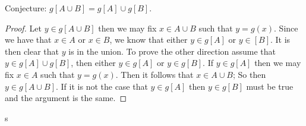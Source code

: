\documentclass[11pt,largemargins]{homework}
\begin{document}
\begin{alphaparts}
    Conjecture: $g[A \cup B] = g[A] \cup g[B]$. 

    \begin{proof}
        Let $y \in g[A \cup B]$ then we may fix $x \in A \cup B$ such that $y = g(x)$. Since we have that $x \in A$ or $x \in B$, we know that either $y \in g[A] $ or $y \in [B]$. It is then clear that $y$ is in the union. 
        To prove the other direction assume that $y \in g[A] \cup g[B]$, then either $y \in g[A] $ or $y \in g[B]$. If $y \in g[A]$ then we may fix $x \in A$ such that $y = g(x)$. Then it follows that $x \in A \cup B$; So then $y \in g[A \cup B]$. If it is not the case 
        that $y \in g[A]$ then $y \in g[B]$ must be true and the argument is the same. 
    \end{proof}



\end{alphaparts}

\question
s
\end{document}
